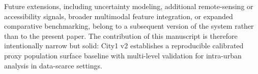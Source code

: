 Future extensions, including uncertainty modeling, additional remote-sensing or accessibility signals, broader multimodal feature integration, or expanded comparative benchmarking, belong to a subsequent version of the system rather than to the present paper. The contribution of this manuscript is therefore intentionally narrow but solid: City1 v2 establishes a reproducible calibrated proxy population surface baseline with multi-level validation for intra-urban analysis in data-scarce settings.
